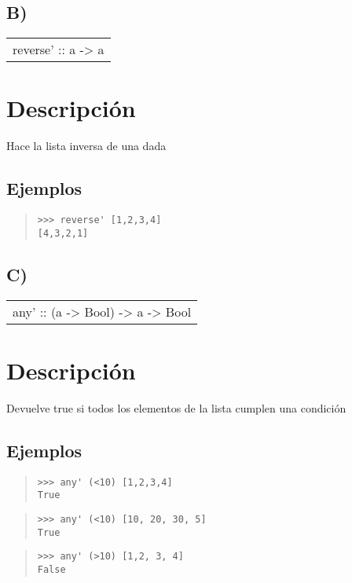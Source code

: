 \subsection{B)}
\begin{haddockdesc}
\item[\begin{tabular}{@{}l}
reverse' :: {\char 91}a{\char 93} -> {\char 91}a{\char 93}
\end{tabular}]
{\haddockbegindoc
\section*{Descripción}
Hace la lista inversa de una dada\par
\subsection*{Ejemplos}
\begin{quote}
{\haddockverb\begin{verbatim}
>>> reverse' [1,2,3,4]
[4,3,2,1]

\end{verbatim}}
\end{quote}}
\end{haddockdesc}
\subsection{C)}
\begin{haddockdesc}
\item[\begin{tabular}{@{}l}
any' :: (a -> Bool) -> {\char 91}a{\char 93} -> Bool
\end{tabular}]
{\haddockbegindoc
\section*{Descripción}
Devuelve true si todos los elementos de la lista cumplen una condición\par
\subsection*{Ejemplos}
\begin{quote}
{\haddockverb\begin{verbatim}
>>> any' (<10) [1,2,3,4]
True

\end{verbatim}}
\end{quote}
\begin{quote}
{\haddockverb\begin{verbatim}
>>> any' (<10) [10, 20, 30, 5]
True

\end{verbatim}}
\end{quote}
\begin{quote}
{\haddockverb\begin{verbatim}
>>> any' (>10) [1,2, 3, 4]
False

\end{verbatim}}
\end{quote}}
\end{haddockdesc}

